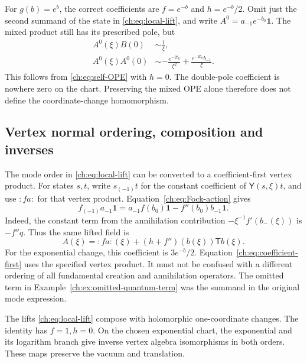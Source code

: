 \begin{example}\label{ch:ex:omitted-quantum-term}
For $g(b)=e^b$, the correct coefficients are $f=e^{-b}$ and
$h=e^{-b}/2$.
Omit just the second summand of the state in
\eqref{ch:eq:local-lift}, and write $A^0=a_{-1}e^{-b_0}\mathbf1$.
The mixed product still has its prescribed pole, but
\begin{equation}\label{ch:eq:omitted-self-OPE}
 \begin{aligned}
 A^0(\xi)B(0)&\sim\frac1\xi,\\
 A^0(\xi)A^0(0)&\sim
       -\frac{e^{-2b_0}}{\xi^2}
       +\frac{e^{-2b_0}b_{-1}}\xi.
 \end{aligned}
\end{equation}
This follows from \eqref{ch:eq:self-OPE} with $h=0$.
The double-pole coefficient is nowhere zero on the chart.
Preserving the mixed OPE alone therefore does not define the
coordinate-change homomorphism.
\end{example}

\subsection{Vertex normal ordering, composition and inverses}

The mode order in \eqref{ch:eq:local-lift} can be converted
to a coefficient-first vertex product.
For states $s,t$, write $s_{(-1)}t$ for the constant coefficient
of $\mathsf Y(s,\xi)t$, and use $:f a:$ for that vertex product.
Equation~\eqref{ch:eq:Fock-action} gives
\begin{equation}\label{ch:eq:ordering-conversion}
       f_{(-1)}a_{-1}\mathbf1
         =a_{-1}f(b_0)\mathbf1-f''(b_0)b_{-1}\mathbf1.
\end{equation}
Indeed, the constant term from the annihilation contribution
$-\xi^{-1}f'(b_-(\xi))$ is $-f''q$.
Thus the same lifted field is
\begin{equation}\label{ch:eq:coefficient-first}
                 A(\xi)=:f a:(\xi)
                       +(h+f'')(b(\xi))\mathsf T b(\xi).
\end{equation}
For the exponential change, this coefficient is $3e^{-b}/2$.
Equation~\eqref{ch:eq:coefficient-first} uses the specified
vertex product. It must not be confused with a different
ordering of all fundamental creation and annihilation operators.
The omitted term in Example~\ref{ch:ex:omitted-quantum-term}
was the summand in the original mode expression.

\begin{proposition}\label{ch:prop:composition}
The lifts \eqref{ch:eq:local-lift} compose with holomorphic
one-coordinate changes. The identity has $f=1,h=0$.
On the chosen exponential chart, the exponential and its
logarithm branch give inverse vertex algebra isomorphisms in
both orders. These maps preserve the vacuum and translation.
\end{proposition}

